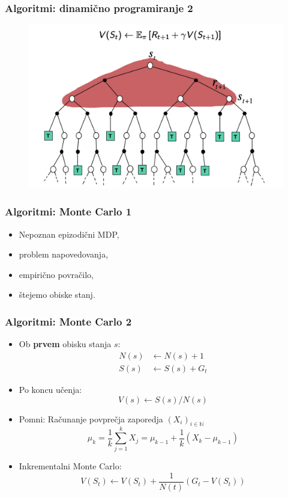 \documentclass{beamer}    %
\begin{document}
\begin{frame}
    \frametitle{Algoritmi: dinamično programiranje 2}
    \begin{figure}
        \includegraphics[scale=0.45]{slike/backup-dp.png}
    \end{figure}
\end{frame}


\begin{frame}
    \frametitle{Algoritmi: Monte Carlo 1}
    \begin{itemize}
        \item Nepoznan epizodični MDP, 
        \item problem napovedovanja, 
        \item empirično povračilo, 
        \item štejemo obiske stanj.
    \end{itemize}
\end{frame}


\begin{frame}
    \frametitle{Algoritmi: Monte Carlo 2}
    \begin{itemize}
        \item Ob \textbf{prvem} obisku stanja $s$: 
        \begin{align*}
            N(s) &\leftarrow N(s) + 1 \\
            S(s) &\leftarrow S(s) + G_t
        \end{align*}
        \item Po koncu učenja: 
        $$
        V(s) \leftarrow S(s) / N(s)
        $$
       \item Pomni: Računanje povprečja zaporedja $(X_i)_{i \in \mathbb{N}}$
       $$
       \mu_k = \frac{1}{k} \sum_{j=1}^k X_j = \mu_{k-1} + \frac{1}{k} (X_k - \mu_{k-1})
       $$
       \item Inkrementalni Monte Carlo:
       $$
       V(S_t) \leftarrow V(S_t) + \frac{1}{N(t)} (G_t - V(S_t))
       $$
    \end{itemize}
\end{frame}
\end{document}
